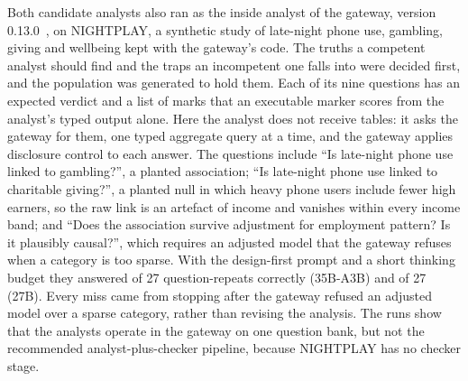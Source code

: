 Both candidate analysts also ran as the inside analyst of the  gateway, version 0.13.0~\cite{wade2026safetre}, on NIGHTPLAY, a synthetic study of late-night phone use, gambling, giving and wellbeing kept with the gateway's code. The truths a competent analyst should find and the traps an incompetent one falls into were decided first, and the population was generated to hold them. Each of its nine questions has an expected verdict and a list of marks that an executable marker scores from the analyst's typed output alone. Here the analyst does not receive tables: it asks the gateway for them, one typed aggregate query at a time, and the gateway applies disclosure control to each answer. The questions include ``Is late-night phone use linked to gambling?'', a planted association; ``Is late-night phone use linked to charitable giving?'', a planted null in which heavy phone users include fewer high earners, so the raw link is an artefact of income and vanishes within every income band; and ``Does the association survive adjustment for employment pattern? Is it plausibly causal?'', which requires an adjusted model that the gateway refuses when a category is too sparse. With the design-first prompt and a short thinking budget they answered  of 27 question-repeats correctly (35B-A3B) and  of 27 (27B). Every miss came from stopping after the gateway refused an adjusted model over a sparse category, rather than revising the analysis. The runs show that the analysts operate in the gateway on one question bank, but not the recommended analyst-plus-checker pipeline, because NIGHTPLAY has no checker stage.
